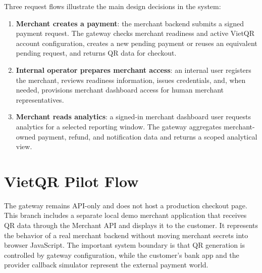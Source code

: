 Three request flows illustrate the main design decisions in the system:

\begin{enumerate}
  \item \textbf{Merchant creates a payment}: the merchant backend submits a
  signed payment request. The gateway checks merchant readiness and active
  VietQR account configuration, creates a new pending payment or reuses an
  equivalent pending request, and returns QR data for checkout.
  \item \textbf{Internal operator prepares merchant access}: an internal user
  registers the merchant, reviews readiness information, issues credentials,
  and, when needed, provisions merchant dashboard access for human merchant
  representatives.
  \item \textbf{Merchant reads analytics}: a signed-in merchant dashboard user
  requests analytics for a selected reporting window. The gateway aggregates
  merchant-owned payment, refund, and notification data and returns a scoped
  analytical view.
\end{enumerate}

\section{VietQR Pilot Flow}

The gateway remains API-only and does not host a production checkout page.
This branch includes a separate local demo merchant application that receives
QR data through the Merchant API and displays it to the customer. It represents
the behavior of a real merchant backend without moving merchant secrets into
browser JavaScript. The important system boundary is that QR generation is
controlled by gateway configuration, while the customer's bank app and the
provider callback simulator represent the external payment world.

